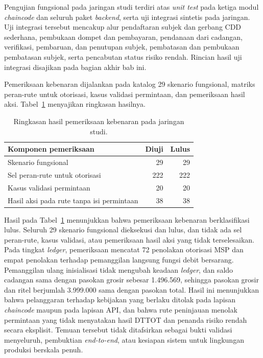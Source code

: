 Pengujian fungsional pada jaringan studi terdiri atas \textit{unit test} pada ketiga
modul \textit{chaincode} dan seluruh paket \textit{backend}, serta uji integrasi
sintetis pada jaringan. Uji integrasi tersebut mencakup alur pendaftaran subjek dan gerbang CDD sederhana,
pembukaan dompet dan pembayaran, pendanaan dari cadangan, verifikasi, pembaruan, dan penutupan subjek, pembatasan dan
pembukaan pembatasan subjek, serta pencabutan status risiko rendah. Rincian hasil uji integrasi disajikan pada bagian akhir
bab ini.

Pemeriksaan kebenaran dijalankan pada katalog 29 skenario fungsional, matriks peran-rute untuk otorisasi, kasus validasi permintaan, dan pemeriksaan hasil aksi. Tabel~\ref{tab:ch4-ringkasan-kebenaran} menyajikan ringkasan hasilnya.

\begin{table}[H]
\caption{Ringkasan hasil pemeriksaan kebenaran pada jaringan studi.}
\label{tab:ch4-ringkasan-kebenaran}
\vspace{0.5em}
\centering
\begin{tabular}{lrr}
\toprule
Komponen pemeriksaan & Diuji & Lulus \\
\midrule
Skenario fungsional & 29 & 29 \\
Sel peran-rute untuk otorisasi & 222 & 222 \\
Kasus validasi permintaan & 20 & 20 \\
Hasil aksi pada rute tanpa isi permintaan & 38 & 38 \\
\bottomrule
\end{tabular}
\end{table}

Hasil pada Tabel~\ref{tab:ch4-ringkasan-kebenaran} menunjukkan bahwa pemeriksaan kebenaran berklasifikasi lulus. Seluruh 29 skenario fungsional dieksekusi dan lulus, dan tidak ada sel peran-rute, kasus validasi, atau pemeriksaan hasil aksi yang tidak terselesaikan. Pada tingkat \textit{ledger}, pemeriksaan mencatat 72 penolakan otorisasi MSP dan empat penolakan terhadap pemanggilan langsung fungsi debit bersarang. Pemanggilan ulang inisialisasi tidak mengubah keadaan \textit{ledger}, dan saldo cadangan sama dengan pasokan grosir sebesar 1.496.569, sehingga pasokan grosir dan ritel berjumlah 3.999.000 sama dengan pasokan total. Hasil ini menunjukkan bahwa pelanggaran terhadap kebijakan yang berlaku ditolak pada lapisan \textit{chaincode} maupun pada lapisan API, dan bahwa rute peninjauan menolak permintaan yang tidak menyatakan hasil DTTOT dan penanda risiko rendah secara eksplisit. Temuan tersebut tidak ditafsirkan sebagai
bukti validasi menyeluruh, pembuktian \textit{end-to-end}, atau kesiapan sistem untuk
lingkungan produksi berskala penuh.

